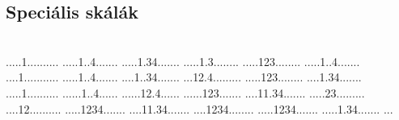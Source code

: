  
 
\pagestyle{empty}

\vspace*{\fill}
\subsection*{Speciális skálák}~\\
          {.....1..........%
           .....1..4.......%
           .....1.34.......%
           .....1.3........%
           .....123........%
           .....1..4.......}
          {....1...........%
           .....1..4.......%
           ....1..34.......%
           ...12.4.........%
           .....123........%
           ....1.34.......}
          {.....1..........%
           ......1..4......%
           ......12.4......%
           ......123.......%
           ....11.34.......%
           .....23.........}
          {....12..........%
           .....1234.......%
           ....11.34.......%
           ....1234........%
           .....1234.......%
           .....1.34.......}
\Huge...
\vspace*{\fill}

